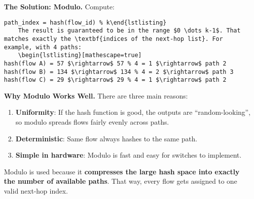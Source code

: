 \begin{deepeningbox}
    \textcolor{Green3}{ \textbf{The Solution: Modulo.}} Compute:
    \begin{lstlisting}
path_index = hash(flow_id) % k\end{lstlisting}
    The result is guaranteed to be in the range $0 \dots k-1$. That matches exactly the \textbf{indices of the next-hop list}. For example, with 4 paths:
    \begin{lstlisting}[mathescape=true]
hash(flow A) = 57 $\rightarrow$ 57 % 4 = 1 $\rightarrow$ path 2
hash(flow B) = 134 $\rightarrow$ 134 % 4 = 2 $\rightarrow$ path 3
hash(flow C) = 29 $\rightarrow$ 29 % 4 = 1 $\rightarrow$ path 2        
    \end{lstlisting}
    \textcolor{Green3}{ \textbf{Why Modulo Works Well.}} There are three main reasons:
    \begin{enumerate}
        \item \textbf{Uniformity}: If the hash function is good, the outputs are ``random-looking'', so modulo spreads flows fairly evenly across paths.
        \item \textbf{Deterministic}: Same flow always hashes to the same path.
        \item \textbf{Simple in hardware}: Modulo is fast and easy for switches to implement.
    \end{enumerate}
    Modulo is used because it \textbf{compresses the large hash space into exactly the number of available paths}. That way, every flow gets assigned to one valid next-hop index.
\end{deepeningbox}